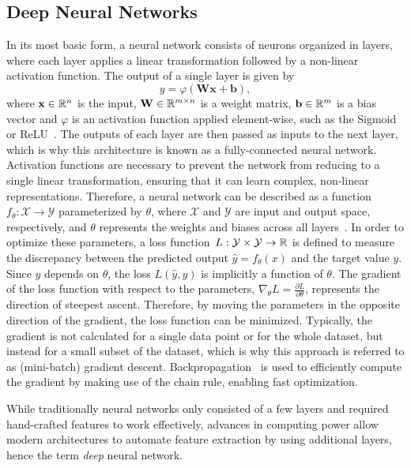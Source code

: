 \subsection{Deep Neural Networks}

In its most basic form, a neural network consists of neurons organized in layers, where each layer applies a linear transformation followed by a non-linear activation function.
The output of a single layer is given by
\begin{equation}
    y = \varphi(\mathbf{W}\mathbf{x} + \mathbf{b}),
\end{equation}
where $\mathbf{x} \in \mathbb{R}^n$ is the input, $\mathbf{W} \in \mathbb{R}^{m \times n}$ is a weight matrix, $\mathbf{b} \in \mathbb{R}^m$ is a bias vector and $\varphi$ is an activation function applied element-wise, such as the Sigmoid or ReLU~\cite{ReLU}.
The outputs of each layer are then passed as inputs to the next layer, which is why this architecture is known as a fully-connected neural network. 
Activation functions are necessary to prevent the network from reducing to a single linear transformation, ensuring that it can learn complex, non-linear representations.
Therefore, a neural network can be described as a function~$f_{\theta}: \mathcal{X} \rightarrow \mathcal{Y}$ parameterized by $\theta$, where $\mathcal{X}$ and $\mathcal{Y}$ are input and output space, respectively, and $\theta$ represents the weights and biases across all layers~\cite{DeepLearning}.
In order to optimize these parameters, a loss function~$L: \mathcal{Y} \times \mathcal{Y} \rightarrow \mathbb{R}$ is defined to measure the discrepancy between the predicted output $\hat{y} = f_\theta(x)$ and the target value $y$. 
Since $\hat{y}$ depends on $\theta$, the loss $L(\hat{y}, y)$ is implicitly a function of $\theta$.
The gradient of the loss function with respect to the parameters, $\nabla_\theta L = \frac{\partial L}{\partial \theta}$, represents the direction of steepest ascent.
Therefore, by moving the parameters in the opposite direction of the gradient, the loss function can be minimized.
Typically, the gradient is not calculated for a single data point or for the whole dataset, but instead for a small subset of the dataset, which is why this approach is referred to as (mini-batch) gradient descent.
Backpropagation~\cite{Backpropagation} is used to efficiently compute the gradient by making use of the chain rule, enabling fast optimization.

While traditionally neural networks only consisted of a few layers and required hand-crafted features to work effectively, advances in computing power allow modern architectures to automate feature extraction by using additional layers, hence the term \textit{deep} neural network.

